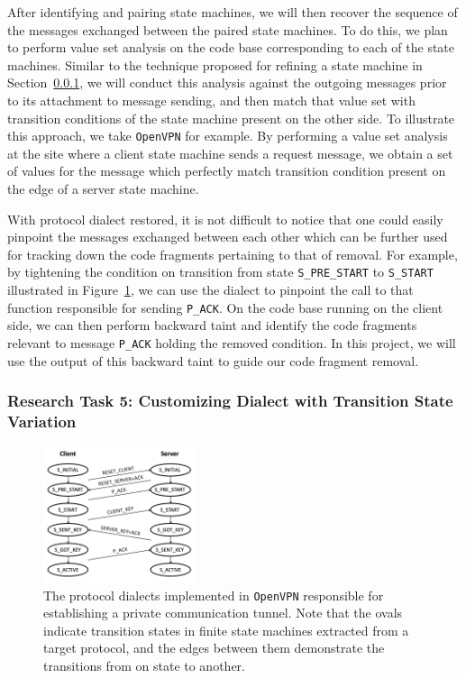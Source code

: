 After identifying and pairing state machines, we will then recover the sequence of the messages exchanged between the paired state machines. To do this, we plan to  perform value set analysis on the code base corresponding to each of the state machines. Similar to the technique proposed for refining a state machine in Section~\ref{}, we will conduct this analysis against the outgoing messages prior to its attachment to message sending, and then match that value set with transition conditions of the state machine present on the other side. To illustrate this approach, we take \texttt{OpenVPN} for example. By performing a value set analysis at the site where a client state machine sends a request message, we obtain a set of values for the message which perfectly match transition condition  present on the edge of a server state machine.   


With protocol dialect restored, it is not difficult to notice that one could easily pinpoint the messages exchanged between each other which can be further used for tracking down the code fragments pertaining to that of removal. For example, by tightening the condition on transition from state \texttt{S\_PRE\_START} to \texttt{S\_START} illustrated in Figure~\ref{fig:original_dialect}, we can use the dialect to pinpoint the call to that function responsible for sending \texttt{P\_ACK}. On the code base running on the client side, we can then perform backward taint and identify the code fragments relevant to message \texttt{P\_ACK} holding the removed condition. In this project, we will use the output of this backward taint to guide our code fragment removal.

\subsubsection{Research Task 5: Customizing Dialect with Transition State Variation}

\begin{figure}
  \centering
  \includegraphics[width=0.4\textwidth]{figure/openvpn_protocol}
  \caption{The protocol dialects implemented in \texttt{OpenVPN} responsible for establishing a private communication tunnel. Note that the ovals indicate transition states in finite state machines extracted from a target protocol, and the edges between them demonstrate the transitions from on state to another.}
  \label{fig:original_dialect}
\end{figure}

